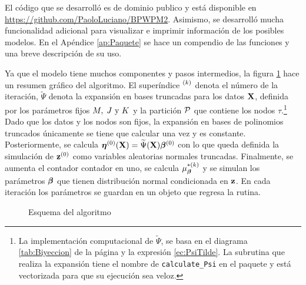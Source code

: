\documentclass[../Main/Main.tex]{subfiles}
\begin{document}
El código que se desarrolló es de dominio publico y está disponible en \url{https://github.com/PaoloLuciano/BPWPM2}. Asimismo, se desarrolló mucha funcionalidad adicional para visualizar e imprimir información de los posibles modelos. En el Apéndice \ref{ap:Paquete} se hace un compendio de las funciones y una breve descripción de su uso. 

Ya que el modelo tiene muchos componentes y pasos intermedios, la figura \ref{fig:DiagramaAlgoritmo} hace un resumen gráfico del algoritmo. El superíndice $\iter{k}$ denota el número de la iteración, $\widetilde{\Psi}$ denota la expansión en bases truncadas para los datos $\xmat$,  definida por los parámetros fijos $\MJK$ y la partición $\P$ que contiene los nodos $\tau$.\footnote{La implementación computacional de $\widetilde{\Psi}$, se basa en el diagrama \ref{tab:Biyeccion} de la página \pageref{tab:Biyeccion} y la expresión \eqref{ec:PsiTilde}. La subrutina que realiza la expansión tiene el nombre de \texttt{calculate\_Psi} en el paquete y está vectorizada para que su ejecución sea veloz.} Dado que los datos y los nodos son fijos, la expansión en bases de polinomios truncados únicamente se tiene que calcular una vez y es constante. Posteriormente, se calcula $\bm{\eta}\iter{0}(\xmat) = \widetilde{\Psi}(\xmat)\betabf\iter{0}$ con lo que queda definida la simulación de $\zsn\iter{0}$ como variables aleatorias normales truncadas. Finalmente, se aumenta el contador contador en uno, se calcula $\mu_{\betabf}^{*(k)}$ y se simulan los parámetros $\betabf$ que tienen distribución normal condicionada en $\zsn$. En cada iteración los parámetros se guardan en un objeto que regresa la rutina. 
\begin{figure}[h]
\centering
{}
\caption{Esquema del algoritmo}
\label{fig:DiagramaAlgoritmo}
\end{figure}
\end{document}
